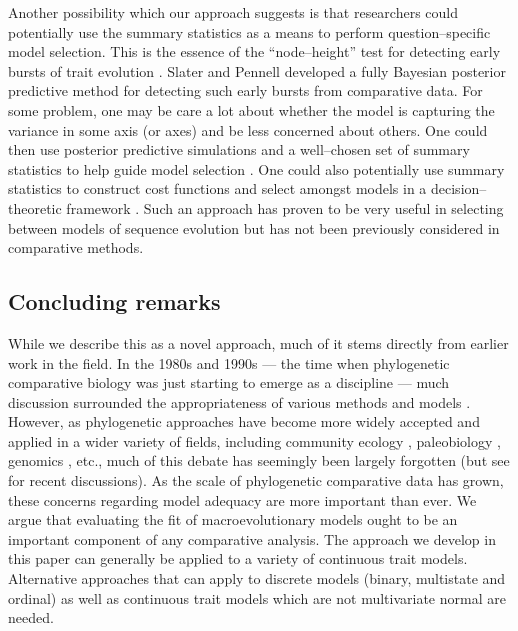 \documentclass[a4paper,12pt]{article}
\begin{document}
Another possibility which our approach suggests is that researchers could potentially use the summary statistics as a means to perform question--specific model selection. This is the essence of the ``node--height'' test for detecting early bursts of trait evolution \citep{FreckletonHarvey2006}. Slater and Pennell \citep{SlaterPennell} developed a fully Bayesian posterior predictive method for detecting such early bursts from comparative data. For some problem, one may be care a lot about whether the model is capturing the variance in some axis (or axes) and be less concerned about others. One could then use posterior predictive simulations and a well--chosen set of summary statistics to help guide model selection \citep{Bollback2002, Lewis2013}. One could also potentially use summary statistics to construct cost functions and select amongst models in a decision--theoretic framework \citep{Robert2007}. Such an approach has proven to be very useful in selecting between models of sequence evolution \citep{Minin2003, SullivanJoyce2005} but has not been previously considered in comparative methods.

\subsection{Concluding remarks}
While we describe this as a novel approach, much of it stems directly from earlier work in the field. In the 1980s and 1990s --- the time when phylogenetic comparative biology was just starting to emerge as a discipline --- much discussion surrounded the appropriateness of various methods and models \citep{Felsenstein1985, Felsenstein1988, HarveyPagel1991, Garland1992, Pagel1993, Diaz1996, Price1997, Garland1999, GarlandIves2000}. However, as phylogenetic approaches have become more widely accepted and applied in a wider variety of fields, including community ecology \citep{Webb2002, CB2009}, paleobiology \citep{Hunt2012}, genomics \citep{Brawand2011}, etc., much of this debate has seemingly been largely forgotten (but see \citep{Losos2011, Hansen2012} for recent discussions). As the scale of phylogenetic comparative data has grown, these concerns regarding model adequacy are more important than ever. We argue that evaluating the fit of macroevolutionary models ought to be an important component of any comparative analysis. The approach we develop in this paper can generally be applied to a variety of continuous trait models. Alternative approaches that can apply to discrete models (binary, multistate and ordinal) as well as continuous trait models which are not multivariate normal are needed. 
\end{document}
